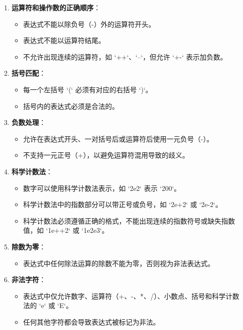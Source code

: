\documentclass{article}
\begin{document}
\begin{enumerate}
    \item \textbf{运算符和操作数的正确顺序}：
    \begin{itemize}
        \item 表达式不能以除负号（-）外的运算符开头。
        \item 表达式不能以运算符结尾。
        \item 不允许出现连续的运算符，如 `++`、`--`，但允许 `+-` 表示加负数。
    \end{itemize}

    \item \textbf{括号匹配}：
    \begin{itemize}
        \item 每一个左括号 `(` 必须有对应的右括号 `)`。
        \item 括号内的表达式必须是合法的。
    \end{itemize}

    \item \textbf{负数处理}：
    \begin{itemize}
        \item 允许在表达式开头、一对括号后或运算符后使用一元负号（-）。
        \item 不支持一元正号（+），以避免运算符混用导致的歧义。
    \end{itemize}

    \item \textbf{科学计数法}：
    \begin{itemize}
        \item 数字可以使用科学计数法表示，如 `2e2` 表示 `200`。
        \item 科学计数法中的指数部分可以带正号或负号，如 `2e+2` 或 `2e-2`。
        \item 科学计数法必须遵循正确的格式，不能出现连续的指数符号或缺失指数值，如 `1e++2` 或 `1e2e3`。
    \end{itemize}

    \item \textbf{除数为零}：
    \begin{itemize}
        \item 表达式中任何除法运算的除数不能为零，否则视为非法表达式。
    \end{itemize}

    \item \textbf{非法字符}：
    \begin{itemize}
        \item 表达式中仅允许数字、运算符（+、-、*、/）、小数点、括号和科学计数法的 `e` 或 `E`。
        \item 任何其他字符都会导致表达式被标记为非法。
    \end{itemize}
\end{enumerate}
\end{document}
